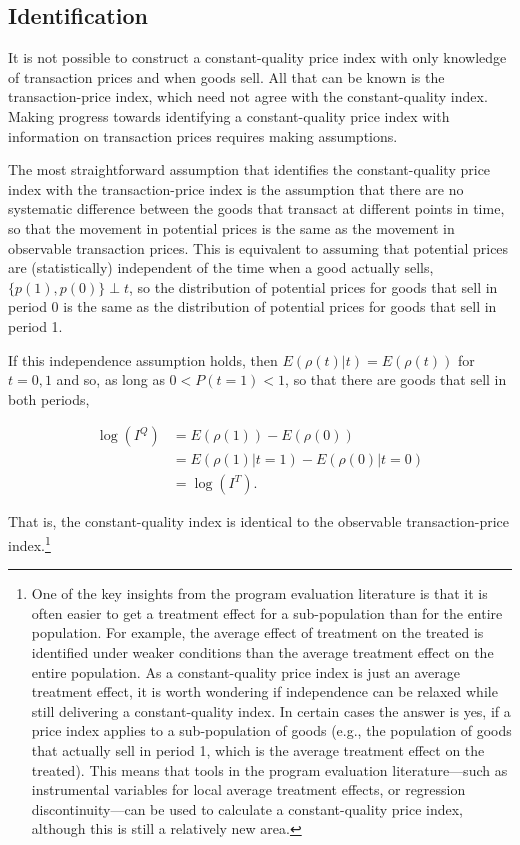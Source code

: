 \documentclass[]{article}
\begin{document}
\hypertarget{identification}{%
\subsection{Identification}\label{identification}}

It is not possible to construct a constant-quality price index with only knowledge of transaction prices and when goods sell. All that can be known is the transaction-price index, which need not agree with the constant-quality index. Making progress towards identifying a constant-quality price index with information on transaction prices requires making assumptions.

The most straightforward assumption that identifies the constant-quality price index with the transaction-price index is the assumption that there are no systematic difference between the goods that transact at different points in time, so that the movement in potential prices is the same as the movement in observable transaction prices. This is equivalent to assuming that potential prices are (statistically) independent of the time when a good actually sells, \(\{p(1), p(0)\} \perp t\), so the distribution of potential prices for goods that sell in period 0 is the same as the distribution of potential prices for goods that sell in period 1.

If this independence assumption holds, then \(E(\rho(t) | t) = E(\rho(t))\) for \(t=0,1\) and so, as long as \(0 < P(t = 1) < 1\), so that there are goods that sell in both periods,

\begin{align*}
\log(I^{Q}) &= E(\rho(1)) - E(\rho(0)) \\ 
&= E(\rho(1) | t = 1) - E(\rho(0) | t = 0) \\
&= \log(I^{T}).
\end{align*}

That is, the constant-quality index is identical to the observable transaction-price index.\footnote{One of the key insights from the program evaluation literature is that it is often easier to get a treatment effect for a sub-population than for the entire population. For example, the average effect of treatment on the treated is identified under weaker conditions than the average treatment effect on the entire population. As a constant-quality price index is just an average treatment effect, it is worth wondering if independence can be relaxed while still delivering a constant-quality index. In certain cases the answer is yes, if a price index applies to a sub-population of goods (e.g., the population of goods that actually sell in period 1, which is the average treatment effect on the treated). This means that tools in the program evaluation literature---such as instrumental variables for local average treatment effects, or regression discontinuity---can be used to calculate a constant-quality price index, although this is still a relatively new area.}
\end{document}
